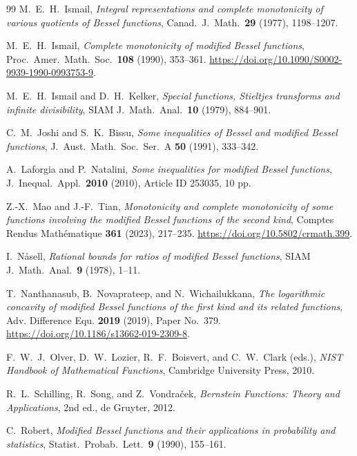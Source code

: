 \documentclass[preprint,12pt]{elsarticle}
\theoremstyle{plain}
\theoremstyle{definition}
\theoremstyle{remark}
\begin{document}
\begin{thebibliography}{99}
M.~E.~H.~Ismail,
\emph{Integral representations and complete monotonicity of various
quotients of Bessel functions},
Canad.\ J.\ Math.\ \textbf{29} (1977), 1198--1207.

M.~E.~H.~Ismail,
\emph{Complete monotonicity of modified Bessel functions},
Proc.\ Amer.\ Math.\ Soc.\ \textbf{108} (1990), 353--361.
\url{https://doi.org/10.1090/S0002-9939-1990-0993753-9}.

M.~E.~H.~Ismail and D.~H.~Kelker,
\emph{Special functions, Stieltjes transforms and infinite divisibility},
SIAM J.\ Math.\ Anal.\ \textbf{10} (1979), 884--901.

C.~M.~Joshi and S.~K.~Bissu,
\emph{Some inequalities of Bessel and modified Bessel functions},
J.\ Aust.\ Math.\ Soc.\ Ser.\ A \textbf{50} (1991), 333--342.

A.~Laforgia and P.~Natalini,
\emph{Some inequalities for modified Bessel functions},
J.\ Inequal.\ Appl.\ \textbf{2010} (2010), Article ID 253035, 10 pp.

Z.-X.~Mao and J.-F.~Tian,
\emph{Monotonicity and complete monotonicity of some functions involving the
modified Bessel functions of the second kind},
Comptes Rendus Math\'ematique \textbf{361} (2023), 217--235.
\url{https://doi.org/10.5802/crmath.399}.

I.~N\r{a}sell,
\emph{Rational bounds for ratios of modified Bessel functions},
SIAM J.\ Math.\ Anal.\ \textbf{9} (1978), 1--11.

T.~Nanthanasub, B.~Novaprateep, and N.~Wichailukkana,
\emph{The logarithmic concavity of modified Bessel functions of the first kind
and its related functions},
Adv. Difference Equ. \textbf{2019} (2019), Paper No.~379.
\url{https://doi.org/10.1186/s13662-019-2309-8}.

F.~W.~J.~Olver, D.~W.~Lozier, R.~F.~Boisvert, and C.~W.~Clark (eds.),
\emph{NIST Handbook of Mathematical Functions},
Cambridge University Press, 2010.

R.~L.~Schilling, R.~Song, and Z.~Vondra\v{c}ek,
\emph{Bernstein Functions: Theory and Applications},
2nd ed., de Gruyter, 2012.

C.~Robert,
\emph{Modified Bessel functions and their applications in probability and
statistics},
Statist.\ Probab.\ Lett.\ \textbf{9} (1990), 155--161.


\end{thebibliography}
\end{document}
